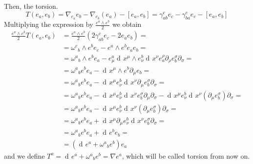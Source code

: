 \documentclass[a4paper,12pt]{book}
\newcommand{\dd}{\mathop{\mathrm{d}\!}{}}
\theoremstyle{definition}
\theoremstyle{remark}
\begin{document}
Then, the torsion.
\[T(e_a,e_b)=\nabla_{e_a}e_b-\nabla_{e_b}(e_a)-[e_a,e_b]=\gamma_{ab}^ce_c-\gamma_{ba}^ce_c-[e_a,e_b]\]
Multiplying the expression by $\frac{e^a\wedge e^b}{2}$ we obtain
\begin{align*}
\frac{e^a\wedge e^b}{2}T(e_a,e_b)&=\frac{e^a\wedge e^b}{2}(2\gamma_{ab}^ce_c-2e_ae_b)=\\
&=\omega^c{}_b\wedge e^be_c-e^a\wedge e^be_ae_b=\\
&=\omega^a{}_b\wedge e^be_a-e_\mu^a\dd x^\mu\wedge e_\nu^b\dd x^\nu e^\rho_a\partial_\rho e^\sigma_b\partial_\sigma=\\
&=\omega^a{}_be^be_a-\dd x^\mu\wedge e^b\partial_\mu e_b=\\
&=\omega^a{}_be^be_a-\dd x^\mu e^b_\nu\dd x^\nu \partial_\mu e^\sigma_b\partial_\sigma=\\
&=\omega^a{}_be^be_a-\dd x^\mu e^b_\nu \dd x^\nu e^\sigma_b\partial_\mu\partial_\sigma-\dd x^\mu e^b_\nu \dd x^\nu (\partial_\mu e^\sigma_b)\partial_\sigma=\\
&=\omega^a{}_be^be_a-\dd x^\mu e^b_\nu \dd x^\nu (\partial_\mu e^\sigma_b)\partial_\sigma=\\
&=\omega^a{}_be^be_a+\dd x^\mu\partial_\mu e^b_\nu\dd x^\nu e^\sigma_b\partial_\sigma=\\
&=\omega^a{}_be^be_a+\dd e^be_b=\\
&=(\dd e^a+\omega^a{}_be^b)e_a
\end{align*}
and we define $T^a=\dd e^a+\omega^a{}_be^b=\nabla e^a$, which will be called torsion from now on.
\end{document}
